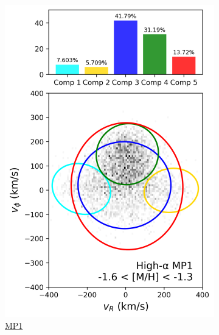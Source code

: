 \documentclass[a4paper,12pt]{article}
\begin{document}
\begin{figure}[H]
\begin{subfigure}{0.245\linewidth}
    \includegraphics[width=\linewidth]{../figures/gmm_mp1_high_alpha_k5.png}
    \caption{\href{https://raw.githack.com/raunaq-rai/Disentangling-the-Milky-Way-using-GMM/main/figures/MP1\_high\_\_\_-1.6\%5BM\_H\%5D-1.3.html}{MP1}}
    \label{fig:mp1_hi}
  \end{subfigure}\hfill
  \begin{subfigure}{0.245\linewidth}

\end{subfigure}
\end{figure}
\end{document}
